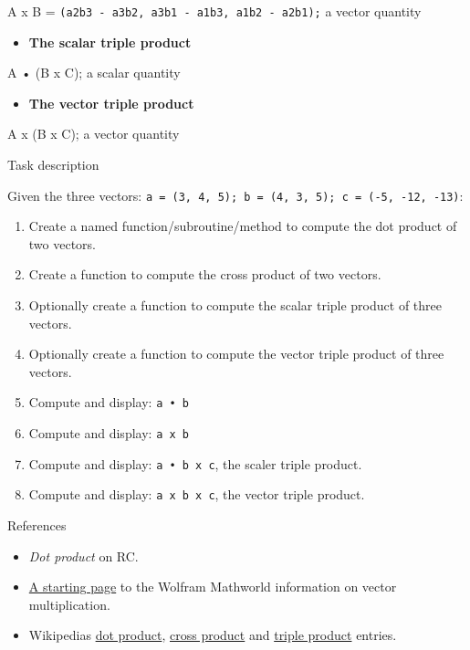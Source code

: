 A x B = \texttt{(a2b3 - a3b2, a3b1 - a1b3, a1b2 - a2b1);} a vector
quantity

\begin{itemize}
\item
  \textbf{The scalar triple product}
\end{itemize}

A • (B x C); a scalar quantity

\begin{itemize}
\item
  \textbf{The vector triple product}
\end{itemize}

A x (B x C); a vector quantity

Task description

Given the three vectors:
\texttt{a = (3, 4, 5);  b = (4, 3, 5);  c = (-5, -12, -13)}:

\begin{enumerate}
\item
  Create a named function/subroutine/method to compute the dot product
  of two vectors.
\item
  Create a function to compute the cross product of two vectors.
\item
  Optionally create a function to compute the scalar triple product of
  three vectors.
\item
  Optionally create a function to compute the vector triple product of
  three vectors.
\item
  Compute and display: \texttt{a • b}
\item
  Compute and display: \texttt{a x b}
\item
  Compute and display: \texttt{a • b x c}, the scaler triple product.
\item
  Compute and display: \texttt{a x b x c}, the vector triple product.
\end{enumerate}


\pagebreak{}
\begin{description}
\item[References]
\end{description}

\begin{itemize}
\item
  \emph{Dot product} on RC.
\item
  \href{http://mathworld.wolfram.com/VectorMultiplication.html}{A
  starting page} to the Wolfram Mathworld information on vector
  multiplication.
\item
  Wikipedias \href{http://en.wikipedia.org/wiki/Dot\_product}{dot
  product}, \href{http://en.wikipedia.org/wiki/Cross\_product}{cross
  product} and
  \href{http://en.wikipedia.org/wiki/Triple\_product}{triple product}
  entries.
\end{itemize}

